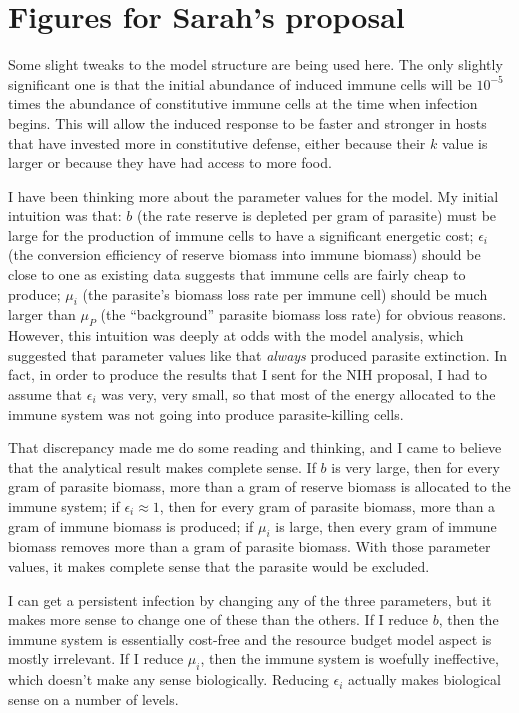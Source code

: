\documentclass[12pt,reqno,final,pdftex]{amsart}\usepackage[]{graphicx}\usepackage[]{color}
\theoremstyle{plain}
\numberwithin{equation}{part}
\begin{document}
\section*{Figures for Sarah's proposal}
Some slight tweaks to the model structure are being used here.
The only slightly significant one is that the initial abundance of induced immune cells will be $10^{-5}$ times the abundance of constitutive immune cells at the time when infection begins.
This will allow the induced response to be faster and stronger in hosts that have invested more in constitutive defense, either because their $k$ value is larger or because they have had access to more food.


\clearpage

I have been thinking more about the parameter values for the model.
My initial intuition was that: $b$ (the rate reserve is depleted per gram of parasite) must be large for the production of immune cells to have a significant energetic cost;
$\epsilon_i$ (the conversion efficiency of reserve biomass into immune biomass) should be close to one as existing data suggests that immune cells are fairly cheap to produce;
$\mu_i$ (the parasite's biomass loss rate per immune cell) should be much larger than $\mu_P$ (the ``background'' parasite biomass loss rate) for obvious reasons.
However, this intuition was deeply at odds with the model analysis, which suggested that parameter values like that \emph{always} produced parasite extinction.
In fact, in order to produce the results that I sent for the NIH proposal, I had to assume that $\epsilon_i$ was very, very small, so that most of the energy allocated to the immune system was not going into produce parasite-killing cells.

That discrepancy made me do some reading and thinking, and I came to believe that the analytical result makes complete sense.
If $b$ is very large, then for every gram of parasite biomass, more than a gram of reserve biomass is allocated to the immune system;
if $\epsilon_i \approx 1$, then for every gram of parasite biomass, more than a gram of immune biomass is produced;
if $\mu_i$ is large, then every gram of immune biomass removes more than a gram of parasite biomass.
With those parameter values, it makes complete sense that the parasite would be excluded.

I can get a persistent infection by changing any of the three parameters, but it makes more sense to change one of these than the others.
If I reduce $b$, then the immune system is essentially cost-free and the resource budget model aspect is mostly irrelevant.
If I reduce $\mu_i$, then the immune system is woefully ineffective, which doesn't make any sense biologically.
Reducing $\epsilon_i$ actually makes biological sense on a number of levels.
\end{document}
